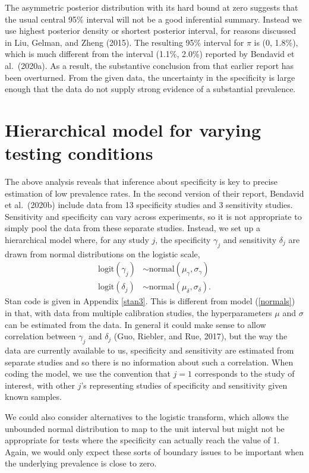 \documentclass[11pt]{article}
\begin{document}
The asymmetric posterior distribution with its hard bound at zero suggests that the usual central 95\% interval will not be a good inferential summary.  Instead we use highest posterior density or shortest posterior interval, for reasons discussed in Liu, Gelman, and Zheng (2015). The resulting 95\% interval for $\pi$ is (0, 1.8\%), which is much different from the interval (1.1\%, 2.0\%) reported by Bendavid et al.\ (2020a).  As a result, the substantive conclusion from that earlier report has been overturned. From the given data, the uncertainty in the specificity is large enough that the data do not supply strong evidence of a substantial prevalence.

\section{Hierarchical model for varying testing conditions}\label{model2}
The above analysis reveals that inference about specificity is key to precise estimation of low prevalence rates.  In the second version of their report, Bendavid et al.\ (2020b) include data from 13 specificity studies and 3 sensitivity studies.  Sensitivity and specificity can vary across experiments, so it is not appropriate to simply pool the data from these separate studies.  Instead, we set up a hierarchical model where, for any study $j$, the specificity $\gamma_j$ and sensitivity $\delta_j$ are drawn from normal distributions on the logistic scale,
\begin{align*}
  \mbox{logit}(\gamma_j) & \sim \mbox{normal}(\mu_{\gamma}, \sigma_{\gamma})\\
 \mbox{logit}(\delta_j) & \sim \mbox{normal}(\mu_{\delta}, \sigma_{\delta}).
\end{align*}
Stan code is given in Appendix \ref{stan3}.
This is different from model (\ref{normals}) in that, with data from multiple calibration studies, the hyperparameters $\mu$ and $\sigma$ can be estimated from the data.  In general it could make sense to allow correlation between $\gamma_j$ and $\delta_j$ (Guo, Riebler, and Rue, 2017), but the way the data are currently available to us, specificity and sensitivity are estimated from separate studies and so there is no information about such a correlation.  When coding the model, we use the convention that $j=1$ corresponds to the study of interest, with other $j$'s representing studies of specificity and sensitivity given known samples.

We could also consider alternatives to the logistic transform, which allows the unbounded normal distribution to map to the unit interval but might not be appropriate for tests where the specificity can actually reach the value of 1.  Again, we would only expect these sorts of boundary issues to be important when the underlying prevalence is close to zero.
\end{document}
